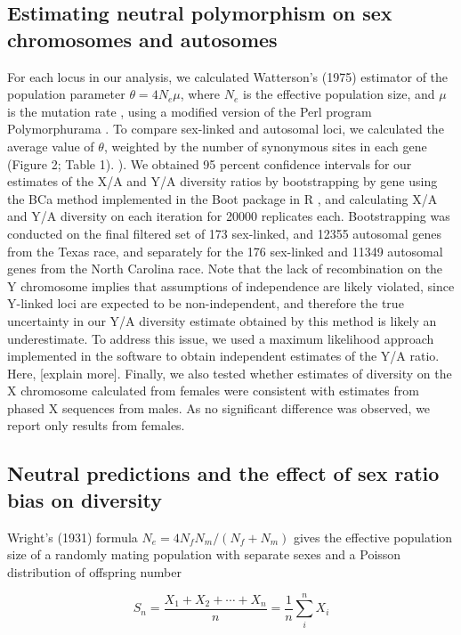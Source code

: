 \documentclass[9pt,twocolumn,twoside]{gsajnl}
\begin{document}
\subsection*{Estimating neutral polymorphism on sex chromosomes and autosomes} 
For each locus in our analysis, we calculated Watterson’s (1975) estimator of the population parameter $\theta=4N_{e}\mu$, where $N_{e}$ is the effective population size, and $\mu$ is the mutation rate \citep{watterson1975}, using a modified version of the Perl program Polymorphurama \citep{bachtrog2006}. To compare sex-linked and autosomal loci, we calculated the average value of $\theta$, weighted by the number of synonymous sites in each gene (Figure 2; Table 1). ). We obtained 95 percent confidence intervals for our estimates of the X/A and Y/A diversity ratios by bootstrapping by gene using the BCa method \citep{efron1994} implemented in the Boot package in R \citep{canty2012boot}, and calculating X/A and Y/A diversity on each iteration for 20000 replicates each. Bootstrapping was conducted on the final filtered set of 173 sex-linked, and 12355 autosomal genes from the Texas race, and separately for the 176 sex-linked and 11349 autosomal genes from the North Carolina race. Note that the lack of recombination on the Y chromosome implies that assumptions of independence are likely violated, since Y-linked loci are expected to be non-independent, and therefore the true uncertainty in our Y/A diversity estimate obtained by this method is likely an underestimate. To address this issue, we used a maximum likelihood approach implemented in the software \citep{wright2004hka} to obtain independent estimates of the Y/A ratio. Here, [explain more]. Finally, we also tested whether estimates of diversity on the X chromosome calculated from females were consistent with estimates from phased X sequences from males. As no significant difference was observed, we report only results from females. 

\subsection*{Neutral predictions and the effect of sex ratio bias on diversity} 
Wright's (1931) formula $N_{e}=4N_{f}N_{m}/(N_{f} + N_{m})$ gives the effective population size of a randomly mating population with separate sexes and a Poisson distribution of offspring number

\begin{equation}
S_n = \frac{X_1 + X_2 + \cdots + X_n}{n}
      = \frac{1}{n}\sum_{i}^{n} X_i
\label{eq:refname1}
\end{equation}
\end{document}
